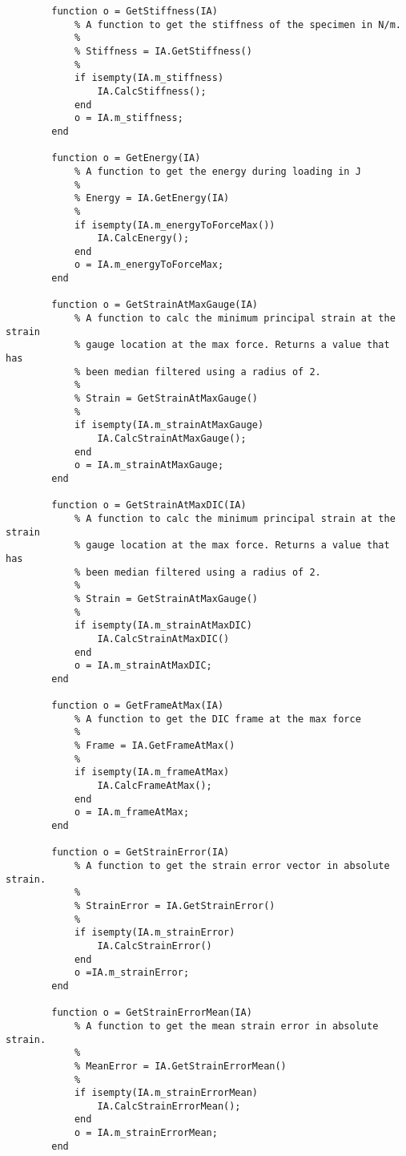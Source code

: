 \begin{lstlisting}
        function o = GetStiffness(IA)
            % A function to get the stiffness of the specimen in N/m.
            %
            % Stiffness = IA.GetStiffness()
            %
            if isempty(IA.m_stiffness)
                IA.CalcStiffness();
            end
            o = IA.m_stiffness;
        end

        function o = GetEnergy(IA)
            % A function to get the energy during loading in J
            %
            % Energy = IA.GetEnergy(IA)
            %
            if isempty(IA.m_energyToForceMax())
                IA.CalcEnergy();
            end
            o = IA.m_energyToForceMax;
        end
        
        function o = GetStrainAtMaxGauge(IA)
            % A function to calc the minimum principal strain at the strain
            % gauge location at the max force. Returns a value that has
            % been median filtered using a radius of 2.
            %
            % Strain = GetStrainAtMaxGauge()
            %
            if isempty(IA.m_strainAtMaxGauge)
                IA.CalcStrainAtMaxGauge();
            end
            o = IA.m_strainAtMaxGauge;
        end
        
        function o = GetStrainAtMaxDIC(IA)
            % A function to calc the minimum principal strain at the strain
            % gauge location at the max force. Returns a value that has
            % been median filtered using a radius of 2.
            %
            % Strain = GetStrainAtMaxGauge()
            %
            if isempty(IA.m_strainAtMaxDIC)
                IA.CalcStrainAtMaxDIC()
            end
            o = IA.m_strainAtMaxDIC;
        end

        function o = GetFrameAtMax(IA)
            % A function to get the DIC frame at the max force
            %
            % Frame = IA.GetFrameAtMax()
            %
            if isempty(IA.m_frameAtMax)
                IA.CalcFrameAtMax();
            end
            o = IA.m_frameAtMax;
        end

        function o = GetStrainError(IA)
            % A function to get the strain error vector in absolute strain.
            %
            % StrainError = IA.GetStrainError()
            %
            if isempty(IA.m_strainError)
                IA.CalcStrainError()
            end
            o =IA.m_strainError;
        end

        function o = GetStrainErrorMean(IA)
            % A function to get the mean strain error in absolute strain.
            %
            % MeanError = IA.GetStrainErrorMean()
            %
            if isempty(IA.m_strainErrorMean)
                IA.CalcStrainErrorMean();
            end
            o = IA.m_strainErrorMean;
        end


\end{lstlisting}
